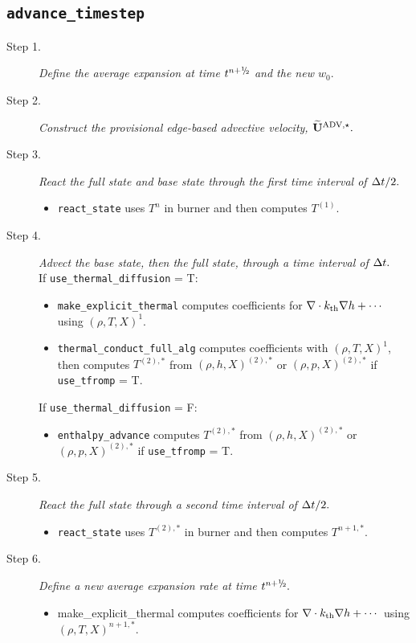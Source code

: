 \subsection{{\tt advance\_timestep}}
\begin{description}
\item[Step 1.] {\em Define the average expansion at time $t^\nph$ and the new $w_0.$}
\item[Step 2.] {\em Construct the provisional edge-based advective velocity, $\widetilde{\mathbf{U}}^{\mathrm{ADV},\star}.$}
\item[Step 3.] {\em React the full state and base state through the first time interval 
of $\Delta t/2.$}
\begin{itemize}
\item{\tt react\_state} uses $T^n$ in burner and then computes $T^{(1)}$.
\end{itemize}
\item[Step 4.] {\em Advect the base state, then the full state, through a time interval 
of $\Delta t.$}\\
If {\tt use\_thermal\_diffusion} = T:
\begin{itemize}
\item {\tt make\_explicit\_thermal} computes coefficients for 
$\nabla\cdot k_{\rm th}\nabla h + \cdots$ using $(\rho,T,X)^1$.
\item {\tt thermal\_conduct\_full\_alg} computes coefficients with $(\rho,T,X)^1$, then 
computes $T^{(2),*}$ from $(\rho,h,X)^{(2),*}$ or $(\rho,p,X)^{(2),*}$ if {\tt use\_tfromp} = T.
\end{itemize}
If {\tt use\_thermal\_diffusion} = F:
\begin{itemize}
\item {\tt enthalpy\_advance} computes $T^{(2),*}$ from $(\rho,h,X)^{(2),*}$ or $(\rho,p,X)^{(2),*}$
if {\tt use\_tfromp} = T.
\end{itemize}
\item[Step 5.] {\em React the full state through a second time interval of $\Delta t/2.$}
\begin{itemize}
\item {\tt react\_state} uses $T^{(2),*}$ in burner and then computes $T^{n+1,*}$.
\end{itemize}
\item[Step 6.] {\em Define a new average expansion rate at time $t^\nph.$}
\begin{itemize}
\item {make\_explicit\_thermal} computes coefficients for 
$\nabla\cdot k_{\rm th}\nabla h + \cdots$ using $(\rho,T,X)^{n+1,*}$.

\end{itemize}
\end{description}
